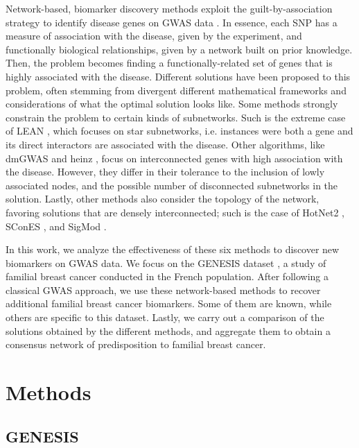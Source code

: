 \documentclass[twocolumn, 10pt]{article}
\begin{document}
Network-based, biomarker discovery methods exploit the guilt-by-association strategy to identify disease genes on GWAS data \cite{azencott_network-guided_2016}. In essence, each SNP has a measure of association with the disease, given by the experiment, and functionally biological relationships, given by a network built on prior knowledge. Then, the problem becomes finding a functionally-related set of genes that is highly associated with the disease. Different solutions have been proposed to this problem, often stemming from divergent different mathematical frameworks and considerations of what the optimal solution looks like. Some methods strongly constrain the problem to certain kinds of subnetworks. Such is the extreme case of LEAN \cite{gwinner_network-based_2016}, which focuses on star subnetworks, i.e. instances were both a gene and its direct interactors are associated with the disease. Other algorithms, like dmGWAS \cite{jia_dmgwas:_2011} and heinz \cite{dittrich_identifying_2008}, focus on interconnected genes with high association with the disease. However, they differ in their tolerance to the inclusion of lowly associated nodes, and the possible number of disconnected subnetworks in the solution. Lastly, other methods also consider the topology of the network, favoring solutions that are densely interconnected; such is the case of HotNet2 \cite{leiserson_pan-cancer_2015}, SConES \cite{azencott_efficient_2013}, and SigMod \cite{liu_sigmod:_2017}.

In this work, we analyze the effectiveness of these six methods to discover new biomarkers on GWAS data. We focus on the GENESIS dataset \cite{sinilnikova_genesis:_2016}, a study of familial breast cancer conducted in the French population. After following a classical GWAS approach, we use these network-based methods to recover additional familial breast cancer biomarkers. Some of them are known, while others are specific to this dataset. Lastly, we carry out a comparison of the solutions obtained by the different methods, and aggregate them to obtain a consensus network of predisposition to familial breast cancer. 

\section{Methods}
\label{sec:org9e7ca64}
\subsection{GENESIS}
\label{sec:org920eb00}
\end{document}

